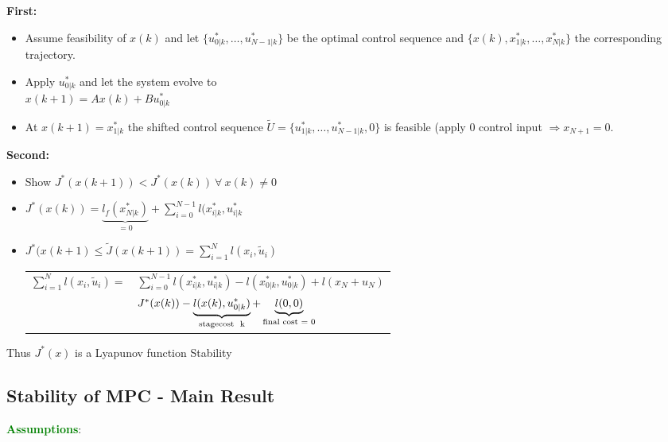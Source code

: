 \documentclass[8pt,a4paper]{scrartcl}
\begin{document}
\begin{multicols*}{3}
\begin{multicols*}{4}
{\textbf{First:}
\begin{itemize}

\item Assume feasibility of $x(k)$ and let $\{u_{0|k}^\ast,\ldots,u_{N-1|k}^\ast\}$ be the optimal control sequence and $\{x(k),x_{1|k}^\ast,\ldots,x_{N|k}^\ast\}$ the corresponding trajectory.
\item Apply $u_{0|k}^\ast$ and let the system evolve to\\$x(k+1)=Ax(k)+Bu_{0|k}^\ast$
\item At $x(k+1)=x_{1|k}^\ast$ the shifted control sequence \mbox{$\tilde{U}=\{u_{1|k}^\ast,\ldots,u_{N-1|k}^\ast, 0\}$} is feasible (apply 0 control input $\Rightarrow x_{N+1}=0$.
\end{itemize}

\textbf{Second:}
\begin{itemize}

\item Show $J^\ast(x(k+1))<J^\ast(x(k))\ \forall\ x(k)\neq 0$
\item $J^\ast(x(k))=\underbrace{l_f(x_{N|k}^\ast)}_{=0}+\sum\limits_{i=0}^{N-1}l(x_{i|k}^\ast,u_{i|k}^\ast$\\
\item $J^\ast(x(k+1)\leq \tilde{J}(x(k+1))=\sum\limits_{i=1}^Nl(x_i,\tilde{u}_i)$

\begin{tabular}{rl}
\small
$\sum\limits_{i=1}^Nl(x_i,\tilde{u}_i)=$&$\sum\limits_{i=0}^{N-1}l(x_{i|k}^\ast,u_{i|k}^\ast)-l(x_{0|k}^\ast,u_{0|k}^\ast)+l(x_N+u_N)$\normalsize\\
&$J^\ast(x(k))-\underbrace{l(x(k),u_{0|k}^\ast)}_{\text{stagecost \@ k}}+\underbrace{l(0,0)}_{\text{final cost = 0}}$
\end{tabular}
\end{itemize}

Thus $J^\ast(x)$ is a Lyapunov function \dahe Stability


}%

\subsection{Stability of MPC - Main Result}

\textcolor{green}{\textbf{Assumptions}}:

\begin{enumerate}


\end{enumerate}
\end{multicols*}
\end{multicols*}
\end{document}
